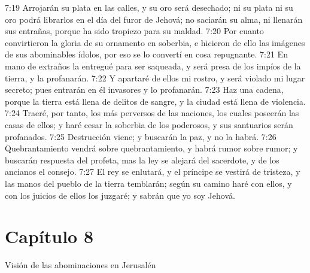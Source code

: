 7:19 Arrojarán su plata en las calles, y su oro será desechado; ni su plata ni su oro podrá librarlos en el día del furor de Jehová; no saciarán su alma, ni llenarán sus entrañas, porque ha sido tropiezo para su maldad.   
7:20 Por cuanto convirtieron la gloria de su ornamento en soberbia, e hicieron de ello las imágenes de sus abominables ídolos, por eso se lo convertí en cosa repugnante.   
7:21 En mano de extraños la entregué para ser saqueada, y será presa de los impíos de la tierra, y la profanarán.   
7:22 Y apartaré de ellos mi rostro, y será violado mi lugar secreto; pues entrarán en él invasores y lo profanarán.   
7:23 Haz una cadena, porque la tierra está llena de delitos de sangre, y la ciudad está llena de violencia.   
7:24 Traeré, por tanto, los más perversos de las naciones, los cuales poseerán las casas de ellos; y haré cesar la soberbia de los poderosos, y sus santuarios serán profanados.   
7:25 Destrucción viene; y buscarán la paz, y no la habrá.   
7:26 Quebrantamiento vendrá sobre quebrantamiento, y habrá rumor sobre rumor; y buscarán respuesta del profeta, mas la ley se alejará del sacerdote, y de los ancianos el consejo.   
7:27 El rey se enlutará, y el príncipe se vestirá de tristeza, y las manos del pueblo de la tierra temblarán; según su camino haré con ellos, y con los juicios de ellos los juzgaré; y sabrán que yo soy Jehová.   
\section*{Capítulo 8  }
Visión de las abominaciones en Jerusalén   
  
